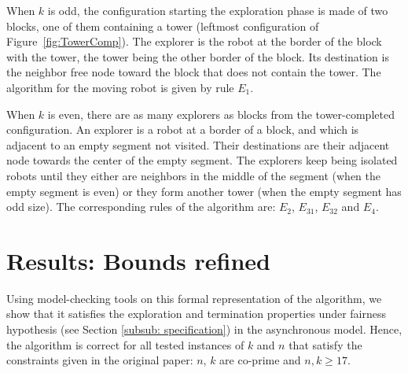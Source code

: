 When $k$ is odd, the configuration starting the exploration phase is
made of two blocks, one of them containing a tower (leftmost
configuration of Figure~\ref{fig:TowerComp}).  The explorer is the
robot at the border of the block with the tower, the tower being the
other border of the block. Its destination is the
neighbor free node toward the block that does not contain the tower.
The algorithm for the moving robot is given by rule $E_1$.

When $k$ is even, there are as many explorers as blocks from the
tower-completed configuration.  An explorer is a robot at a border of
a block, and which is adjacent to an empty segment not visited. Their
destinations are their adjacent node towards the center of the empty
segment.  The explorers keep being isolated robots until they either
are neighbors in the middle of the segment (when the empty segment is
even) or they form another tower (when the empty segment has odd
size).  The corresponding rules of the algorithm are: $E_2$, $E_{31}$, 
$E_{32}$ and $E_4$.


		\section{Results: Bounds refined}
Using model-checking tools on this
formal representation of the algorithm, we show that it satisfies the
exploration and termination properties under fairness hypothesis (see
Section \ref{subsub: specification}) in the asynchronous model.  Hence, the algorithm is correct
for all tested instances of $k$ and $n$ that satisfy the constraints
given in the original paper: $n$, $k$ are co-prime and $n, k \geq 17$.
 
